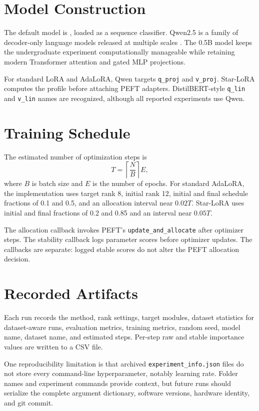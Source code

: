 \section{Model Construction}

The default model is \qwenmodel, loaded as a sequence classifier. Qwen2.5 is a family of
decoder-only language models released at multiple scales \citep{yang2024qwen25}. The 0.5B model
keeps the undergraduate experiment computationally manageable while retaining modern Transformer
attention and gated MLP projections.

For standard LoRA and AdaLoRA, Qwen targets \texttt{q\_proj} and \texttt{v\_proj}. Star-LoRA
computes the profile before attaching PEFT adapters. DistilBERT-style \texttt{q\_lin} and
\texttt{v\_lin} names are recognized, although all reported experiments use Qwen.

\section{Training Schedule}

The estimated number of optimization steps is
\begin{equation}
  T = \left\lceil\frac{N}{B}\right\rceil E,
\end{equation}
where $B$ is batch size and $E$ is the number of epochs. For standard AdaLoRA, the implementation
uses target rank 8, initial rank 12, initial and final schedule fractions of 0.1 and 0.5, and an
allocation interval near $0.02T$. Star-LoRA uses initial and final fractions of 0.2 and 0.85 and
an interval near $0.05T$.

The allocation callback invokes PEFT's \texttt{update\_and\_allocate} after optimizer steps.
The stability callback logs parameter scores before optimizer updates. The callbacks are separate:
logged stable scores do not alter the PEFT allocation decision.

\section{Recorded Artifacts}

Each run records the method, rank settings, target modules, dataset statistics for dataset-aware
runs, evaluation metrics, training metrics, random seed, model name, dataset name, and estimated
steps. Per-step raw and stable importance values are written to a CSV file.

One reproducibility limitation is that archived \texttt{experiment\_info.json} files do not store
every command-line hyperparameter, notably learning rate. Folder names and experiment commands
provide context, but future runs should serialize the complete argument dictionary, software
versions, hardware identity, and git commit.

